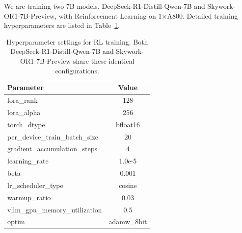 We are training two 7B models, DeepSeek-R1-Distill-Qwen-7B and Skywork-OR1-7B-Preview, with Reinforcement Learning on 1×A800. 
Detailed training hyperparameters are listed in Table~\ref{tab:training_hyperparameters}.

\begin{table}[h]
    \centering
    \small
    \setlength{\tabcolsep}{15pt} %
    \renewcommand{\arraystretch}{1.1} %
    \begin{tabular}{lc}
    \toprule
    \textbf{Parameter} & \textbf{Value} \\
    \midrule
    lora\_rank & 128 \\
    lora\_alpha & 256 \\
    torch\_dtype & bfloat16 \\
    per\_device\_train\_batch\_size & 20 \\
    gradient\_accumulation\_steps & 4 \\
    learning\_rate & 1.0e-5 \\
    beta & 0.001 \\
    lr\_scheduler\_type & cosine \\
    warmup\_ratio & 0.03 \\
    vllm\_gpu\_memory\_utilization & 0.5 \\
    optim & adamw\_8bit \\
    \bottomrule
    \end{tabular}
    \caption{Hyperparameter settings for RL training. Both DeepSeek-R1-Distill-Qwen-7B and Skywork-OR1-7B-Preview share these identical configurations.}
    \label{tab:training_hyperparameters}
\end{table}


